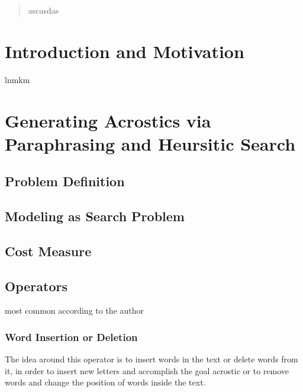 \documentclass{reportAlternative}
\begin{document}
\begin{abstract}
ascasdas
\end{abstract}

\chapter{Introduction and Motivation}
lnmkm
\chapter{Generating Acrostics via Paraphrasing and Heursitic Search}

\section{Problem Definition}

\section{Modeling as Search Problem}

\section{Cost Measure}

\section{Operators}
most common according to the author

\subsection{Word Insertion or Deletion}
The idea around this operator is to insert words in the text or delete words from it, in order to insert new letters and accomplish the goal acrostic or to remove words and change the position of words inside the text. \par
\end{document}

